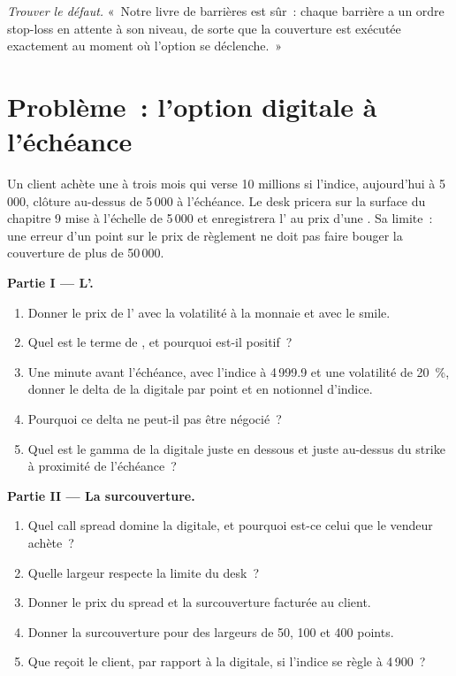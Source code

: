 \begin{exercise}[$\star\star\star$]\label{exo:dv:barriers-and-digitals:8}
\emph{Trouver le défaut.} «~Notre livre de barrières est sûr~: chaque barrière a un ordre stop-loss en attente à son niveau, de sorte que la
couverture est exécutée exactement au moment où l'option se déclenche.~»
\end{exercise}

\section{Problème~: l'option digitale à l'échéance}

\begin{problem}\label{pb:dv:barriers-and-digitals:1}
Un client achète une  à trois mois qui verse 10 millions si l'indice, aujourd'hui à 5\,000, clôture au-dessus de 5\,000 à l'échéance. Le
desk pricera sur la surface du chapitre 9 mise à l'échelle de 5\,000 et enregistrera l' au prix d'une . Sa
limite~: une erreur d'un point sur le prix de règlement ne doit pas faire bouger la couverture de plus de 50\,000.

\medskip\noindent\textbf{Partie I --- L'.}
\begin{enumerate}
\item Donner le prix de l' avec la volatilité à la monnaie et avec le smile.
\item Quel est le terme de , et pourquoi est-il positif~?
\item Une minute avant l'échéance, avec l'indice à 4\,999.9 et une volatilité de 20~\%, donner le delta de la digitale par point et en
notionnel d'indice.
\item Pourquoi ce delta ne peut-il pas être négocié~?
\item Quel est le gamma de la digitale juste en dessous et juste au-dessus du strike à proximité de l'échéance~?
\end{enumerate}

\medskip\noindent\textbf{Partie II --- La surcouverture.}
\begin{enumerate}[resume]
\item Quel call spread domine la digitale, et pourquoi est-ce celui que le vendeur achète~?
\item Quelle largeur respecte la limite du desk~?
\item Donner le prix du spread et la surcouverture facturée au client.
\item Donner la surcouverture pour des largeurs de 50, 100 et 400 points.
\item Que reçoit le client, par rapport à la digitale, si l'indice se règle à 4\,900~?
\end{enumerate}


\end{problem}
